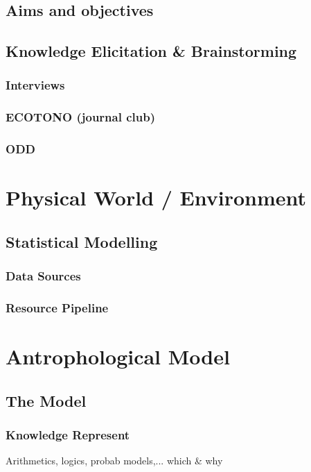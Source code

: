 \documentclass{report}
\begin{document}
	    \subsection{Aims and objectives}
	    \subsection{Knowledge Elicitation \& Brainstorming}
		\subsubsection{Interviews}
		\subsubsection{ECOTONO (journal club)}	
		\subsubsection{ODD}

	\section{Physical World / Environment}		%
		\subsection{Statistical Modelling}
			\subsubsection{Data Sources}
			\subsubsection{Resource Pipeline}
			
	\section{Antrophological Model}				%
		\subsection{The Model}
			\subsubsection{Knowledge Represent}
				Arithmetics, logics, probab models,... which \& why
				
\end{document}

